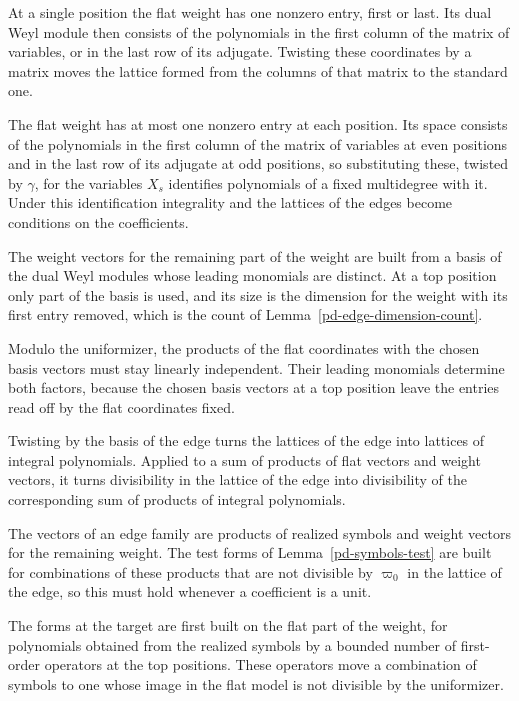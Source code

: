 At a single position the flat weight has one nonzero entry, first or last. Its dual Weyl module then
consists of the polynomials in the first column of the matrix of variables, or in the last row of its
adjugate. Twisting these coordinates by a matrix moves the lattice formed from the columns of that
matrix to the standard one.

The flat weight has at most one nonzero entry at each position. Its space consists of the polynomials in
the first column of the matrix of variables at even positions and in the last row of its adjugate at
odd positions, so substituting these, twisted by $\gamma$, for the variables $X_s$ identifies
polynomials of a fixed multidegree with it. Under this identification integrality and the lattices of
the edges become conditions on the coefficients.

The weight vectors for the remaining part of the weight are built from a basis of the dual Weyl
modules whose leading monomials are distinct. At a top position only part of the basis is used, and
its size is the dimension for the weight with its first entry removed, which is the count of
Lemma~\ref{pd-edge-dimension-count}.

Modulo the uniformizer, the products of the flat coordinates with the chosen basis vectors must stay
linearly independent. Their leading monomials determine both factors, because the chosen basis
vectors at a top position leave the entries read off by the flat coordinates fixed.

Twisting by the basis of the edge turns the lattices of the edge into lattices of integral
polynomials. Applied to a sum of products of flat vectors and weight vectors, it turns divisibility in
the lattice of the edge into divisibility of the corresponding sum of products of integral
polynomials.

The vectors of an edge family are products of realized symbols and weight vectors for the remaining
weight. The test forms of Lemma~\ref{pd-symbols-test} are built for combinations of these products that
are not divisible by $\varpi_0$ in the lattice of the edge, so this must hold whenever a coefficient is
a unit.

The forms at the target are first built on the flat part of the weight, for polynomials obtained from
the realized symbols by a bounded number of first-order operators at the top positions. These
operators move a combination of symbols to one whose image in the flat model is not divisible by the
uniformizer.


